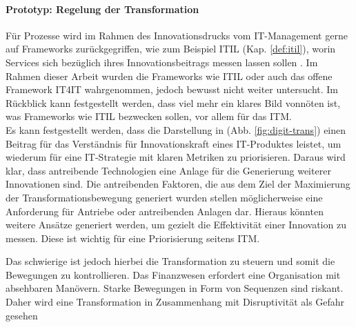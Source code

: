 \paragraph{Prototyp: Regelung der Transformation}
Für Prozesse wird im Rahmen des Innovationsdrucks vom IT-Management gerne auf Frameworks zurückgegriffen, wie zum Beispiel ITIL (Kap. \ref{def:itil}), worin Services sich bezüglich ihres Innovationsbeitrags messen lassen sollen \cite{Alt2017}. Im Rahmen dieser Arbeit wurden die Frameworks wie ITIL oder auch das offene Framework IT4IT wahrgenommen, jedoch bewusst nicht weiter untersucht. Im Rückblick kann festgestellt werden, dass viel mehr ein klares Bild vonnöten ist, was Frameworks wie ITIL bezwecken sollen, vor allem für das \ac{ITM}.
\medskip
\\
Es kann festgestellt werden, dass die Darstellung in (Abb. \ref{fig:digit-trans}) einen Beitrag für das Verständnis für Innovationskraft eines IT-Produktes leistet, um wiederum für eine IT-Strategie mit klaren Metriken zu priorisieren. Daraus wird klar, dass antreibende Technologien eine Anlage für die Generierung weiterer Innovationen sind. Die antreibenden Faktoren, die aus dem Ziel der Maximierung der Transformationsbewegung generiert wurden stellen möglicherweise eine Anforderung für Antriebe oder antreibenden Anlagen dar. Hieraus könnten weitere Ansätze generiert werden, um gezielt die Effektivität einer Innovation zu messen. Diese ist wichtig für eine Priorisierung seitens \ac{ITM}.

Das schwierige ist jedoch hierbei die Transformation zu steuern und somit die Bewegungen zu kontrollieren. Das Finanzwesen erfordert eine Organisation mit absehbaren Manövern. Starke Bewegungen in Form von Sequenzen sind riskant. Daher wird eine Transformation in Zusammenhang mit Disruptivität als Gefahr gesehen \cite{eba:2019}

